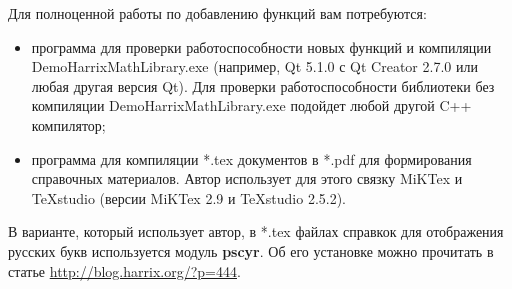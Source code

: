 Для полноценной работы по добавлению функций вам потребуются:
\begin{itemize}
\item программа для проверки работоспособности новых функций и компиляции DemoHarrixMathLibrary.exe (например, Qt 5.1.0 с Qt Creator 2.7.0 или любая другая версия Qt). Для проверки работоспособности библиотеки без компиляции DemoHarrixMathLibrary.exe подойдет любой другой C++ компилятор;
\item программа для компиляции *.tex документов в *.pdf для формирования справочных материалов. Автор использует для этого связку MiKTex и TeXstudio (версии MiKTex 2.9 и TeXstudio 2.5.2).
\end{itemize}

В варианте, который использует автор, в *.tex файлах справкок для отображения русских букв используется модуль \textbf{pscyr}. Об его установке можно прочитать в статье \href{http://blog.harrix.org/?p=444}{http://blog.harrix.org/?p=444}.

